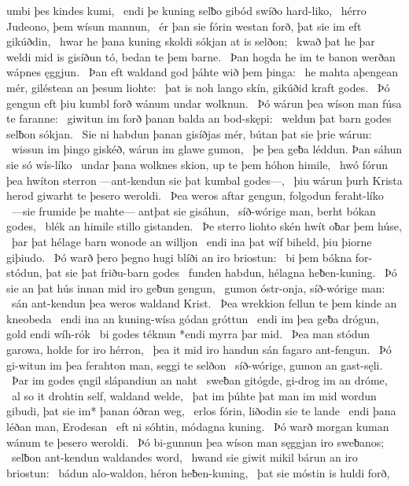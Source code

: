 umbi þes kindes kumi, \hld\ endi þe kuning selƀo gibód
swíðo hard-liko, \hld\ hérro Judeono,
þem wísun mannun, \hld\ ér þan sie fórin westan forð,
þat sie im eft gikúðdin, \hld\ hwar he þana kuning skoldi
sókjan at is selðon; \hld\ kwað þat he þar weldi mid is gisíðun tó,
bedan te þem barne. \hld\ Þan hogda he im te banon werðan
wápnes ęggjun. \hld\ Þan eft waldand god
þáhte wið þem þinga: \hld\ he mahta aþengean mér,
giléstean an þesum liohte: \hld\ þat is noh lango skín,
gikúðid kraft godes. \hld\ Þó gengun eft þiu kumbl forð
wánum undar wolknun. \hld\ Þó wárun þea wíson man
fúsa te faranne: \hld\ giwitun im forð þanan
balda an bod-skępi: \hld\ weldun þat barn godes
selƀon sókjan. \hld\ Sie ni habdun þanan gisíðjas mér,
bútan þat sie þrie wárun: \hld\ wissun im þingo giskéð,
wárun im glawe gumon, \hld\ þe þea geƀa léddun.
Þan sáhun sie só wís-líko \hld\ undar þana wolknes skion,
up te þem hóhon himile, \hld\ hwó fórun þea hwíton sterron
—ant-kendun sie þat kumbal godes—, \hld\ þiu wárun þurh Krista herod
giwarht te þesero weroldi. \hld\ Þea weros aftar gengun,
folgodun feraht-líko \hld\ —sie frumide þe mahte—
antþat sie gisáhun, \hld\ síð-wórige man,
berht bókan godes, \hld\ blék an himile
stillo gistanden. \hld\ Þe sterro liohto skén
hwít oƀar þem húse, \hld\ þar þat hélage barn
wonode an willjon \hld\ endi ina þat wíf biheld,
þiu þiorne giþiudo. \hld\ Þó warð þero þegno hugi
blíði an iro briostun: \hld\ bi þem bókna for-stódun,
þat sie þat friðu-barn godes \hld\ funden habdun,
hélagna heƀen-kuning. \hld\ Þó sie an þat hús innan
mid iro geƀun gengun, \hld\ gumon óstr-onja,
síð-wórige man: \hld\ sán ant-kendun
þea weros waldand Krist. \hld\ Þea wrekkion fellun
te þem kinde an kneobeda \hld\ endi ina an kuning-wísa
gódan gróttun \hld\ endi im þea geƀa drógun,
gold endi wíh-rók \hld\ bi godes téknun
*endi myrra þar mid. \hld\ Þea man stódun garowa,
holde for iro hérron, \hld\ þea it mid iro handun sán
fagaro ant-fengun. \hld\ Þó gi-witun im þea ferahton man,
seggi te selðon \hld\ síð-wórige,
gumon an gast-sęli. \hld\ Þar im godes ęngil
slápandiun an naht \hld\ sweƀan gitógde,
gi-drog im an dróme, \hld\ al so it drohtin self,
waldand welde, \hld\ þat im þúhte þat man im mid wordun gibudi,
þat sie im* þanan óðran weg, \hld\ erlos fórin,
liðodin sie te lande \hld\ endi þana léðan man,
Erodesan \hld\ eft ni sóhtin,
módagna kuning. \hld\ Þó warð morgan kuman
wánum te þesero weroldi. \hld\ Þó bi-gunnun þea wíson man
sęggjan iro sweƀanos; \hld\ selƀon ant-kendun
waldandes word, \hld\ hwand sie giwit mikil
bárun an iro briostun: \hld\ bádun alo-waldon,
héron heƀen-kuning, \hld\ þat sie móstin is huldi forð,
